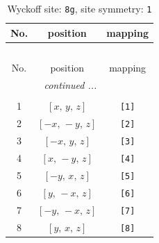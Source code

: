 \documentclass[fleqn,8pt]{jsarticle}
\begin{document}
\renewcommand{\arraystretch}{1.2}
\begin{longtable}{ccc}
\caption{Wyckoff site: {\tt 8g}, site symmetry: {\tt 1}}
 \\
 \hline \hline
No. & position & mapping \\ \hline \endfirsthead

\multicolumn{2}{l}{\tablename\ \thetable{}} \\
 \hline \hline
No. & position & mapping \\ \hline \endhead

 \hline \hline
\multicolumn{2}{r}{\footnotesize\it continued ...} \\ \endfoot

 \hline \hline
\multicolumn{2}{r}{} \\ \endlastfoot

1 & $\left[ x,\, y,\, z \right]$ & {\tt [1]} \\ \hline
2 & $\left[ - x,\, - y,\, z \right]$ & {\tt [2]} \\ \hline
3 & $\left[ - x,\, y,\, z \right]$ & {\tt [3]} \\ \hline
4 & $\left[ x,\, - y,\, z \right]$ & {\tt [4]} \\ \hline
5 & $\left[ - y,\, x,\, z \right]$ & {\tt [5]} \\ \hline
6 & $\left[ y,\, - x,\, z \right]$ & {\tt [6]} \\ \hline
7 & $\left[ - y,\, - x,\, z \right]$ & {\tt [7]} \\ \hline
8 & $\left[ y,\, x,\, z \right]$ & {\tt [8]} \\
\end{longtable}
\end{document}
